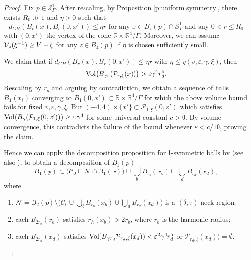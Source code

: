 \documentclass[11pt,reqno]{amsart}
\numberwithin{equation}{section}
\newcommand{\RR}{\mathds{R}}
\newcommand{\Vol}{{\rm Vol}}
\newcommand{\cC}{\mathcal{C}}
\newcommand{\cN}{\mathcal{N}}
\newcommand{\cP}{\mathcal{P}}
\newcommand{\cS}{\mathcal{S}}
\newcommand{\cV}{\mathcal{V}}
\theoremstyle{definition}
\theoremstyle{remark}
\begin{document}
\begin{proof}
    Fix $p \in \cS^1_{\Gamma}$. After rescaling, by Proposition \ref{p:uniform symmetry}, there exists $R_0 \gg 1$ and $\eta>0$ such that
    \begin{equation}\label{e:bilip assumption}
        d_{GH}(B_{r}(x),B_r(0,x')) \le \eta r \text{ for any } x\in B_4(p)\cap \cS^1_{\Gamma} \text{ and any } 0<r\le R_0
    \end{equation} 
with $(0,x')$ the vertex of the cone $\RR \times \RR^4/\Gamma$. Moreover, we can assume $\cV_z(\xi^{-1}) \ge \Bar{V} - \xi$ for any $z\in B_4(p)$ if $\eta$ is chosen sufficiently small. 

We claim that if $d_{GH}(B_{r}(x),B_r(0,x')) \le \eta r$ with 
$\eta \le \eta(v,\varepsilon,\gamma,\xi)$, then
\begin{equation}\label{eq: size volume pinched}
\Vol\bigl(B_{\gamma r}(\cP_{r,\xi}(x))\bigr) > \varepsilon \gamma^4 r_d^5.    
\end{equation}
Rescaling by $r_d$ and arguing by contradiction, we obtain a sequence of balls $B_1(x_i)$
converging to $B_1(0,x') \subset \RR \times \RR^4/\Gamma$ for which the above volume bound fails for fixed $v,\varepsilon,\gamma,\xi$. But
$(-4,4)\times\{x'\} \subset \cP_{1,\xi}(0,x')$
which satisfies $\Vol\bigl(B_{\gamma}(\cP_{1,\xi}(0,x'))\bigr) \ge c\,\gamma^4$ for some universal constant $c>0$. By volume convergence, this contradicts the failure of the bound
whenever $\varepsilon < c/10$, proving the claim.
    
    Hence we can apply the decomposition proposition for 1-symmetric balls by \cite[Proposition 10.5]{cjn} (see also \cite{jn}), to obtain a decomposition of $B_1(p)$
    \begin{equation*}
        B_1(p) \subset \Big( \cC_0 \cup \cN \cap B_1(x) \Big) \cup \bigcup_b B_{r_b}(x_b) \cup \bigcup_{d}B_{r_d}(x_d),
    \end{equation*}
where
\begin{enumerate}
    \item $\cN = B_2(p) \setminus \Big( \cC_0 \cup \bigcup_b B_{r_b}(x_b) \cup \bigcup_d B_{r_d}(x_d) \Big)$ is a $(\delta,\tau)$-neck region;
    \item each $B_{2r_b}(x_b)$ satisfies $r_h(x_b)>2r_b$, where $r_b$ is the harmonic radius;
    \item each $B_{2r_d}(x_d)$ satisfies $\Vol(B_{\gamma r_d}\cP_{r_d,\xi}(x_d))< \varepsilon^2 \gamma^4 r_d^5$ or $\cP_{r_d,\xi}(x_d))= \emptyset$.
\end{enumerate}


\end{proof}
\end{document}
